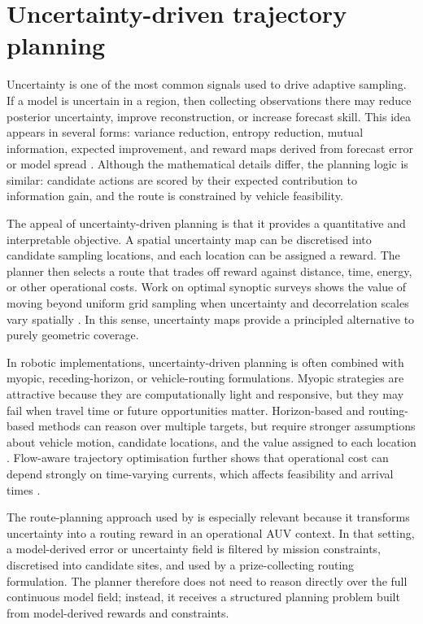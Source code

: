 \section{Uncertainty-driven trajectory planning}
\label{sec:sota_uncertainty_planning}

Uncertainty is one of the most common signals used to drive adaptive sampling. If a model is uncertain in a region, then collecting observations there may reduce posterior uncertainty, improve reconstruction, or increase forecast skill. This idea appears in several forms: variance reduction, entropy reduction, mutual information, expected improvement, and reward maps derived from forecast error or model spread \parencite{hwang2019auvreview,lermusiaux2007adaptive}. Although the mathematical details differ, the planning logic is similar: candidate actions are scored by their expected contribution to information gain, and the route is constrained by vehicle feasibility.

The appeal of uncertainty-driven planning is that it provides a quantitative and interpretable objective. A spatial uncertainty map can be discretised into candidate sampling locations, and each location can be assigned a reward. The planner then selects a route that trades off reward against distance, time, energy, or other operational costs. Work on optimal synoptic surveys shows the value of moving beyond uniform grid sampling when uncertainty and decorrelation scales vary spatially \parencite{frolov2014grid}. In this sense, uncertainty maps provide a principled alternative to purely geometric coverage.

In robotic implementations, uncertainty-driven planning is often combined with myopic, receding-horizon, or vehicle-routing formulations. Myopic strategies are attractive because they are computationally light and responsive, but they may fail when travel time or future opportunities matter. Horizon-based and routing-based methods can reason over multiple targets, but require stronger assumptions about vehicle motion, candidate locations, and the value assigned to each location \parencite{hwang2019auvreview}. Flow-aware trajectory optimisation further shows that operational cost can depend strongly on time-varying currents, which affects feasibility and arrival times \parencite{aguiar2018trajectoryopt}.

The route-planning approach used by \textcite{bernacchi2025closingloop} is especially relevant because it transforms uncertainty into a routing reward in an operational AUV context. In that setting, a model-derived error or uncertainty field is filtered by mission constraints, discretised into candidate sites, and used by a prize-collecting routing formulation. The planner therefore does not need to reason directly over the full continuous model field; instead, it receives a structured planning problem built from model-derived rewards and constraints.

